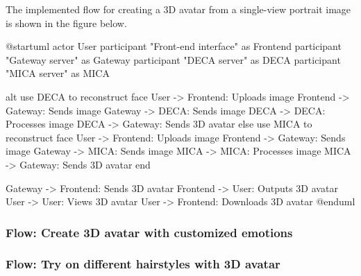 The implemented flow for creating a 3D avatar from a single-view portrait image is shown in the figure below.

\begin{umlfigure}
    @startuml
    actor User
    participant "Front-end interface" as Frontend
    participant "Gateway server" as Gateway
    participant "DECA server" as DECA
    participant "MICA server" as MICA


    alt use DECA to reconstruct face
    User -> Frontend: Uploads image
    Frontend -> Gateway: Sends image
    Gateway -> DECA: Sends image
    DECA -> DECA: Processes image
    DECA -> Gateway: Sends 3D avatar
    else use MICA to reconstruct face
    User -> Frontend: Uploads image
    Frontend -> Gateway: Sends image
    Gateway -> MICA: Sends image
    MICA -> MICA: Processes image
    MICA -> Gateway: Sends 3D avatar
    end

    Gateway -> Frontend: Sends 3D avatar
    Frontend -> User: Outputs 3D avatar
    User -> User: Views 3D avatar
    User -> Frontend: Downloads 3D avatar
    @enduml
\end{umlfigure}


\subsubsection{Flow: Create 3D avatar with customized emotions}

\subsubsection{Flow: Try on different hairstyles with 3D avatar}





